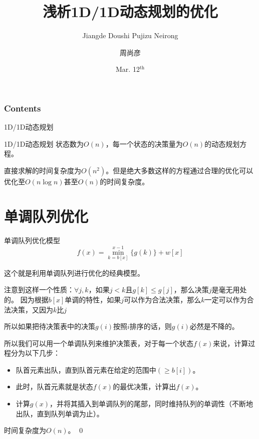 \documentclass[9pt,dvipsnames,table,UTF8,aspectratio=169]{beamer}
\newenvironment{qedf}{%
	\begin{frame}[environment=qedqedframe]%
	}{%
	\qed
	\end{frame}%
}
\begin{document}

\AtBeginSubsection[]
{
	\begin{frame}[shrink]
		\tableofcontents[sectionstyle=show/shaded, subsectionstyle=show/shaded/hide]
	\end{frame}
}

\title{浅析1D/1D动态规划的优化}
\subtitle{Jiangde Doushi Pujizu Neirong}
\author{周尚彦}
\date{Mar. 12$^{\text{th}}$}

\maketitle

\begin{frame}
	\frametitle{Contents}
	
	\tableofcontents[hideallsubsections]
\end{frame}

\begin{frame}{1D/1D动态规划}
	\begin{definition}{1D/1D动态规划}
		状态数为$O(n)$，每一个状态的决策量为$O(n)$的动态规划方程。
	\end{definition}
	直接求解的时间复杂度为$O(n^2)$。但是绝大多数这样的方程通过合理的优化可以优化至$O(n\log{n})$甚至$O(n)$的时间复杂度。
\end{frame}

\section{单调队列优化}
\begin{frame}{单调队列优化模型}
	$$f(x) = \min_{k = b[x]}^{x - 1}\{g(k)\} + w[x]$$
	
	这个就是利用单调队列进行优化的经典模型。

	\pause
	注意到这样一个性质：$\forall j, k$，如果$j < k$且$g[k] \le g[j]$，那么决策$j$是毫无用处的。
	因为根据$b[x]$单调的特性，如果$j$可以作为合法决策，那么$k$一定可以作为合法决策，又因为$k$比$j$
	
	所以如果把待决策表中的决策$g(i)$按照$i$排序的话，则$g(i)$必然是不降的。

\end{frame}

\begin{qedf}
	所以我们可以用一个单调队列来维护决策表，对于每一个状态$f(x)$来说，计算过程分为以下几步：
	\begin{itemize}
		\item 队首元素出队，直到队首元素在给定的范围中$(\ge b[i])$。
		\item 此时，队首元素就是状态$f(x)$的最优决策，计算出$f(x)$。
		\item 计算$g(x)$，并将其插入到单调队列的尾部，同时维持队列的单调性（不断地出队，直到队列单调为止）。
	\end{itemize}

	时间复杂度为$O(n)$。
\end{qedf}
\end{document}
